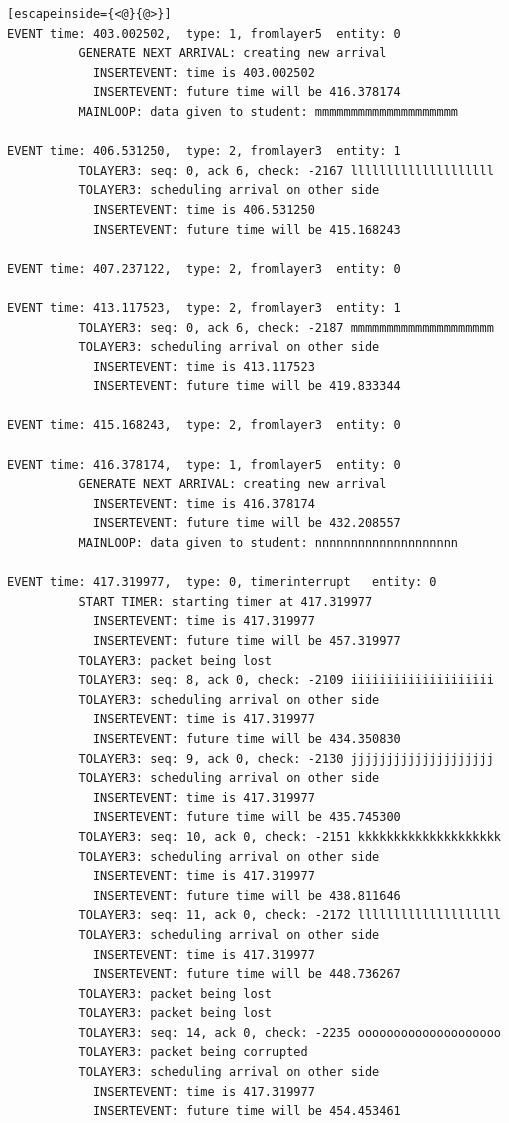 \documentclass[paper=a4, fontsize=11pt]{scrartcl}
\numberwithin{equation}{section}		%
\numberwithin{figure}{section}			%
\numberwithin{table}{section}				%
\begin{document}
\begin{lstlisting}[escapeinside={<@}{@>}]
EVENT time: 403.002502,  type: 1, fromlayer5  entity: 0
          GENERATE NEXT ARRIVAL: creating new arrival
            INSERTEVENT: time is 403.002502
            INSERTEVENT: future time will be 416.378174
          MAINLOOP: data given to student: mmmmmmmmmmmmmmmmmmmm

EVENT time: 406.531250,  type: 2, fromlayer3  entity: 1
          TOLAYER3: seq: 0, ack 6, check: -2167 llllllllllllllllllll
          TOLAYER3: scheduling arrival on other side
            INSERTEVENT: time is 406.531250
            INSERTEVENT: future time will be 415.168243

EVENT time: 407.237122,  type: 2, fromlayer3  entity: 0

EVENT time: 413.117523,  type: 2, fromlayer3  entity: 1
          TOLAYER3: seq: 0, ack 6, check: -2187 mmmmmmmmmmmmmmmmmmmm
          TOLAYER3: scheduling arrival on other side
            INSERTEVENT: time is 413.117523
            INSERTEVENT: future time will be 419.833344

EVENT time: 415.168243,  type: 2, fromlayer3  entity: 0

EVENT time: 416.378174,  type: 1, fromlayer5  entity: 0
          GENERATE NEXT ARRIVAL: creating new arrival
            INSERTEVENT: time is 416.378174
            INSERTEVENT: future time will be 432.208557
          MAINLOOP: data given to student: nnnnnnnnnnnnnnnnnnnn

EVENT time: 417.319977,  type: 0, timerinterrupt   entity: 0
          START TIMER: starting timer at 417.319977
            INSERTEVENT: time is 417.319977
            INSERTEVENT: future time will be 457.319977
          TOLAYER3: packet being lost
          TOLAYER3: seq: 8, ack 0, check: -2109 iiiiiiiiiiiiiiiiiiii
          TOLAYER3: scheduling arrival on other side
            INSERTEVENT: time is 417.319977
            INSERTEVENT: future time will be 434.350830
          TOLAYER3: seq: 9, ack 0, check: -2130 jjjjjjjjjjjjjjjjjjjj
          TOLAYER3: scheduling arrival on other side
            INSERTEVENT: time is 417.319977
            INSERTEVENT: future time will be 435.745300
          TOLAYER3: seq: 10, ack 0, check: -2151 kkkkkkkkkkkkkkkkkkkk
          TOLAYER3: scheduling arrival on other side
            INSERTEVENT: time is 417.319977
            INSERTEVENT: future time will be 438.811646
          TOLAYER3: seq: 11, ack 0, check: -2172 llllllllllllllllllll
          TOLAYER3: scheduling arrival on other side
            INSERTEVENT: time is 417.319977
            INSERTEVENT: future time will be 448.736267
          TOLAYER3: packet being lost
          TOLAYER3: packet being lost
          TOLAYER3: seq: 14, ack 0, check: -2235 oooooooooooooooooooo
          TOLAYER3: packet being corrupted
          TOLAYER3: scheduling arrival on other side
            INSERTEVENT: time is 417.319977
            INSERTEVENT: future time will be 454.453461


\end{lstlisting}
\end{document}
